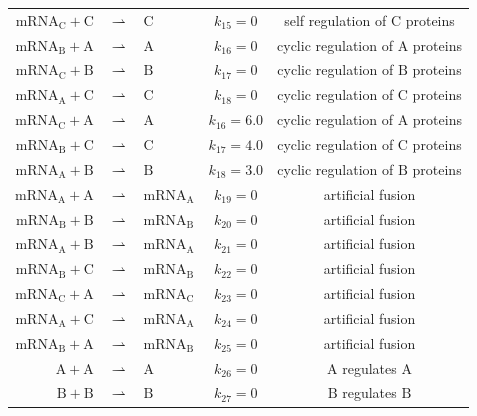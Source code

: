 \documentclass[oneside, abstracton, titlepage]{scrartcl}
\begin{document}
\begin{table}[h]
{\begin{tabular}{rclcc}
				$\mathrm{mRNA}_\mathrm{C} + \mathrm{C}$ &$\rightharpoonup$& $\mathrm{C}$ & $k_{15} = 0$ & self regulation of $\mathrm{C}$ proteins\\
				$\mathrm{mRNA}_\mathrm{B} + \mathrm{A}$ &$\rightharpoonup$& $\mathrm{A}$ & $k_{16} = 0$ & cyclic regulation of $\mathrm{A}$ proteins\\
				$\mathrm{mRNA}_\mathrm{C} + \mathrm{B}$ &$\rightharpoonup$& $\mathrm{B}$ & $k_{17} = 0$ & cyclic regulation of $\mathrm{B}$ proteins\\
				$\mathrm{mRNA}_\mathrm{A} + \mathrm{C}$ &$\rightharpoonup$& $\mathrm{C}$ & $k_{18} = 0$ & cyclic regulation of $\mathrm{C}$ proteins\\
				$\mathrm{mRNA}_\mathrm{C} + \mathrm{A}$ &$\rightharpoonup$& $\mathrm{A}$ & $k_{16} = 6.0$ & cyclic regulation of $\mathrm{A}$ proteins\\
				$\mathrm{mRNA}_\mathrm{B} + \mathrm{C}$ &$\rightharpoonup$& $\mathrm{C}$ & $k_{17} = 4.0$ & cyclic regulation of $\mathrm{C}$ proteins\\
				$\mathrm{mRNA}_\mathrm{A} + \mathrm{B}$ &$\rightharpoonup$& $\mathrm{B}$ & $k_{18} = 3.0$ & cyclic regulation of $\mathrm{B}$ proteins\\
				$\mathrm{mRNA}_\mathrm{A} + \mathrm{A}$ &$\rightharpoonup$& $\mathrm{mRNA}_\mathrm{A}$ & $k_{19} = 0$ & artificial fusion\\
				$\mathrm{mRNA}_\mathrm{B} + \mathrm{B}$ &$\rightharpoonup$& $\mathrm{mRNA}_\mathrm{B}$ & $k_{20} = 0$ & artificial fusion\\
				$\mathrm{mRNA}_\mathrm{A} + \mathrm{B}$ &$\rightharpoonup$& $\mathrm{mRNA}_\mathrm{A}$ & $k_{21} = 0$ & artificial fusion\\
				$\mathrm{mRNA}_\mathrm{B} + \mathrm{C}$ &$\rightharpoonup$& $\mathrm{mRNA}_\mathrm{B}$ & $k_{22} = 0$ & artificial fusion\\
				$\mathrm{mRNA}_\mathrm{C} + \mathrm{A}$ &$\rightharpoonup$& $\mathrm{mRNA}_\mathrm{C}$ & $k_{23} = 0$ & artificial fusion\\
				$\mathrm{mRNA}_\mathrm{A} + \mathrm{C}$ &$\rightharpoonup$& $\mathrm{mRNA}_\mathrm{A}$ & $k_{24} = 0$ & artificial fusion\\
				$\mathrm{mRNA}_\mathrm{B} + \mathrm{A}$ &$\rightharpoonup$& $\mathrm{mRNA}_\mathrm{B}$ & $k_{25} = 0$ & artificial fusion\\
				$\mathrm{A} + \mathrm{A}$ &$\rightharpoonup$& $\mathrm{A}$ & $k_{26} = 0$ & $\mathrm{A}$ regulates $\mathrm{A}$\\
				$\mathrm{B} + \mathrm{B}$ &$\rightharpoonup$& $\mathrm{B}$ & $k_{27} = 0$ & $\mathrm{B}$ regulates $\mathrm{B}$\\

\end{tabular}}
\end{table}
\end{document}
